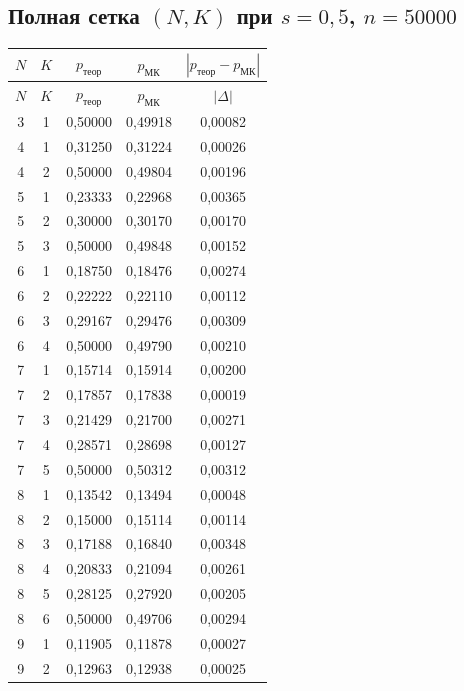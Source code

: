 \documentclass[a4paper, 14pt]{extarticle}
\begin{document}
\subsection{Полная сетка $(N,K)$ при $s=0{,}5$, $n=50000$}
{\footnotesize
\setlength{\LTleft}{\fill}
\setlength{\LTright}{\fill}
\begin{longtable}{|c|c|c|c|c|}
\hline
$N$ & $K$ & $p_{\text{теор}}$ & $p_{\text{МК}}$ & $|p_{\text{теор}}-p_{\text{МК}}|$ \\
\hline
\endfirsthead
\hline
$N$ & $K$ & $p_{\text{теор}}$ & $p_{\text{МК}}$ & $|\Delta|$ \\
\hline
\endhead
3 & 1 & 0{,}50000 & 0{,}49918 & 0{,}00082 \\
\hline
4 & 1 & 0{,}31250 & 0{,}31224 & 0{,}00026 \\
4 & 2 & 0{,}50000 & 0{,}49804 & 0{,}00196 \\
\hline
5 & 1 & 0{,}23333 & 0{,}22968 & 0{,}00365 \\
5 & 2 & 0{,}30000 & 0{,}30170 & 0{,}00170 \\
5 & 3 & 0{,}50000 & 0{,}49848 & 0{,}00152 \\
\hline
6 & 1 & 0{,}18750 & 0{,}18476 & 0{,}00274 \\
6 & 2 & 0{,}22222 & 0{,}22110 & 0{,}00112 \\
6 & 3 & 0{,}29167 & 0{,}29476 & 0{,}00309 \\
6 & 4 & 0{,}50000 & 0{,}49790 & 0{,}00210 \\
\hline
7 & 1 & 0{,}15714 & 0{,}15914 & 0{,}00200 \\
7 & 2 & 0{,}17857 & 0{,}17838 & 0{,}00019 \\
7 & 3 & 0{,}21429 & 0{,}21700 & 0{,}00271 \\
7 & 4 & 0{,}28571 & 0{,}28698 & 0{,}00127 \\
7 & 5 & 0{,}50000 & 0{,}50312 & 0{,}00312 \\
\hline
8 & 1 & 0{,}13542 & 0{,}13494 & 0{,}00048 \\
8 & 2 & 0{,}15000 & 0{,}15114 & 0{,}00114 \\
8 & 3 & 0{,}17188 & 0{,}16840 & 0{,}00348 \\
8 & 4 & 0{,}20833 & 0{,}21094 & 0{,}00261 \\
8 & 5 & 0{,}28125 & 0{,}27920 & 0{,}00205 \\
8 & 6 & 0{,}50000 & 0{,}49706 & 0{,}00294 \\
\hline
9 & 1 & 0{,}11905 & 0{,}11878 & 0{,}00027 \\
9 & 2 & 0{,}12963 & 0{,}12938 & 0{,}00025 \\

\end{longtable}}
\end{document}
